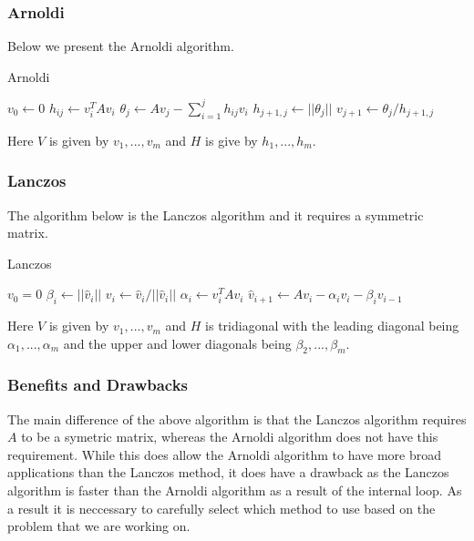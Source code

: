 \subsubsection{Arnoldi}
Below we present the Arnoldi algorithm.
\begin{algorithm}[H]
\caption{Arnoldi \cite{Fan2018}} %
\begin{algorithmic}
\State $v_0 \gets 0$
\State$h_{ij} \gets v_i^T A v_i$
\EndFor
\State$\theta_j \gets Av_j - \sum^j_{i=1} h_{ij}v_i$
\State$h_{j+1,j} \gets ||\theta_j||$
\State$v_{j+1} \gets \theta_j/h_{j+1,j}$
\EndFor
\EndProcedure
\end{algorithmic}
\end{algorithm}
Here $V$ is given by $v_1,...,v_m$ and $H$ is give by $h_1,...,h_m$.\\

\subsubsection{Lanczos}
The algorithm below is the Lanczos algorithm and it requires a symmetric matrix. \cite{Moler2003}
\begin{algorithm}[H]
\caption{Lanczos \cite{OJALVO1970}}
\begin{algorithmic}
\State $v_0 = 0$
\State$\beta_i \gets || \hat v_i ||$
\State$v_i \gets \hat v_i / || \hat v_i ||$
\State$\alpha_i \gets v_i^T A v_i$
\State$\hat v_{i+1} \gets Av_i - \alpha_iv_i - \beta_iv_{i-1}$
\EndFor
\EndProcedure
\end{algorithmic}
\end{algorithm}
Here $V$ is given by ${v_1,...,v_m}$ and $H$ is tridiagonal with the leading diagonal being $\alpha_1, ..., \alpha_m$ and the upper and lower diagonals being $\beta_2,...,\beta_m$.
\subsubsection{Benefits and Drawbacks}
The main difference of the above algorithm is that the Lanczos algorithm requires $A$ to be a symetric matrix, whereas the Arnoldi algorithm does not have this requirement.
While this does allow the Arnoldi algorithm to have more broad applications than the Lanczos method, it does have a drawback as the Lanczos algorithm is faster than the Arnoldi algorithm as a result of the internal loop.
As a result it is neccessary to carefully select which method to use based on the problem that we are working on.

